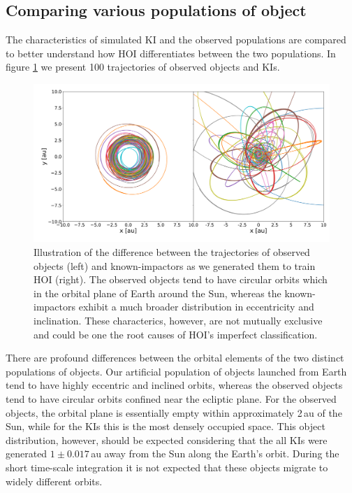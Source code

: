 \documentclass{aa}
\begin{document}
\subsection{Comparing various populations of object}

The characteristics of simulated KI and the observed populations are
compared to better understand how HOI differentiates between the two
populations. In figure \ref{FIG:Object_Trajectories} we present 100
trajectories of observed objects and KIs.

\begin{figure}[h!]
    \hspace*{-0.40cm}
	\includegraphics[width=170mm]{images/5_Trajectories.pdf}
	\centering
	\caption{\label{FIG:Object_Trajectories} Illustration of the
          difference between the trajectories of observed objects
          (left) and known-impactors as we generated them to train HOI
          (right). The observed objects tend to have circular orbits
          which in the orbital plane of Earth around the Sun, whereas
          the known-impactors exhibit a much broader distribution in
          eccentricity and inclination. These characterics, however,
          are not mutually exclusive and could be one the root causes
          of HOI's imperfect classification.}
\end{figure}

There are profound differences between the orbital elements of the two
distinct populations of objects. Our artificial population of objects
launched from Earth tend to have highly eccentric and inclined orbits,
whereas the observed objects tend to have circular orbits confined
near the ecliptic plane. For the observed objects, the orbital plane
is essentially empty within approximately 2\,au of the Sun, while for
the KIs this is the most densely occupied space. This object
distribution, however, should be expected considering that the all KIs
were generated $1\pm0.017$\,au away from the Sun along the Earth's
orbit. During the short time-scale integration it is not expected that
these objects migrate to widely different orbits.
\end{document}

